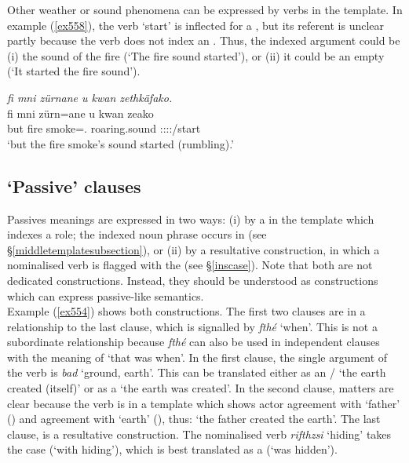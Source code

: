 Other weather or sound phenomena can be expressed by verbs in the  template. In example (\ref{ex558}), the verb `start' is inflected for a \Stsg{} , but its referent is unclear \textendash{} partly because the verb does not index an . Thus, the indexed argument could be (i) the sound of the fire (`The fire sound started'), or (ii) it could be an empty  (`It started the fire sound').

\begin{exe}
	\ex \emph{fi mni zürnane u kwan zethkäfako.}\\
	\gll fi mni zürn=ane {u kwan} zeako\\
	but fire smoke=\Poss.\Sg{} {roaring.sound} \Sg:\Sbj:\Pst:\Pfv:\Andat/start\\
	\trans `but the fire smoke's sound started (rumbling).'
	\label{ex558}
\end{exe}

\subsection{`Passive' clauses}\label{passiveclause}

Passives meanings are expressed in two ways: (i) by a  in the  template which indexes a  role; the indexed noun phrase occurs in   (see \S{}\ref{middletemplatesubsection}), or (ii) by a resultative construction, in which a nominalised verb is flagged with the   (see \S{}\ref{inscase}). Note that both are not dedicated  constructions. Instead, they should be understood as constructions which can express passive-like semantics.\\

Example (\ref{ex554}) shows both constructions. The first two clauses are in a  relationship to the last clause, which is signalled by \emph{fthé} `when'. This is not a subordinate relationship because \emph{fthé} can also be used in independent clauses with the meaning of `that was when'. In the first clause, the single argument of the verb is \emph{bad} `ground, earth'. This can be translated either as an / `the earth created (itself)' or as a  `the earth was created'. In the second clause, matters are clear because the verb is in a  template which shows actor agreement with `father' (\Erg) and  agreement with `earth' (\Abs), thus: `the father created the earth'. The last clause, is a resultative construction. The nominalised verb \emph{rifthzsi} `hiding' takes the  case (`with hiding'), which is best translated as a  (`was hidden').

